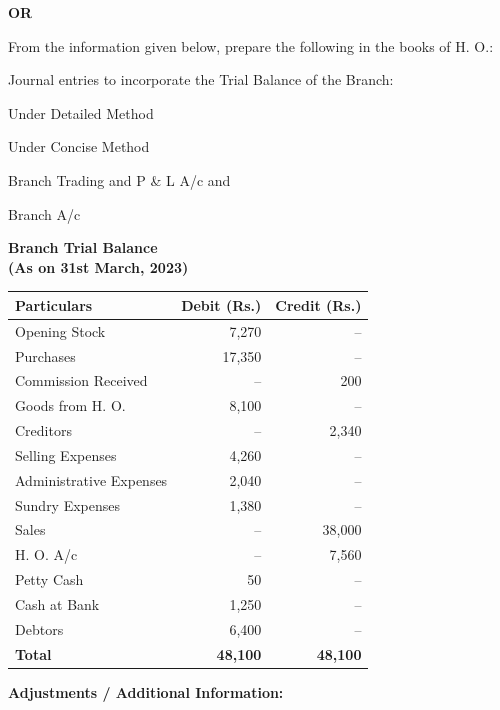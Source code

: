 \documentclass[11pt,a4paper]{article}
\begin{document}
\centerline{   \textbf{OR}}

From the information given below, prepare the following in the books of H. O.:

\begin{parts}
  \item Journal entries to incorporate the Trial Balance of the Branch:
  
\begin{parts}
    \item Under Detailed Method
    \item Under Concise Method
  \end{parts}
  \item Branch Trading and P \& L A/c and
  \item Branch A/c
\end{parts}


\begin{center}
   \textbf{Branch Trial Balance}\\
   \textbf{(As on 31st March, 2023)}
\smallskip

\small

\begin{tabular}{|l|r|r|}
\hline
   \textbf{Particulars} &   \textbf{Debit (Rs.)} &   \textbf{Credit (Rs.)} \\
\hline
Opening Stock & 7,270 & -- \\
Purchases & 17,350 & -- \\
Commission Received & -- & 200 \\
Goods from H. O. & 8,100 & -- \\
Creditors & -- & 2,340 \\
Selling Expenses & 4,260 & -- \\
Administrative Expenses & 2,040 & -- \\
Sundry Expenses & 1,380 & -- \\
Sales & -- & 38,000 \\
H. O. A/c & -- & 7,560 \\
Petty Cash & 50 & -- \\
Cash at Bank & 1,250 & -- \\
Debtors & 6,400 & -- \\
\hline
   \textbf{Total} &   \textbf{48,100} &   \textbf{48,100} \\
\hline
\end{tabular}
\end{center}




\noindent   \textbf{Adjustments / Additional Information:}
\end{document}

